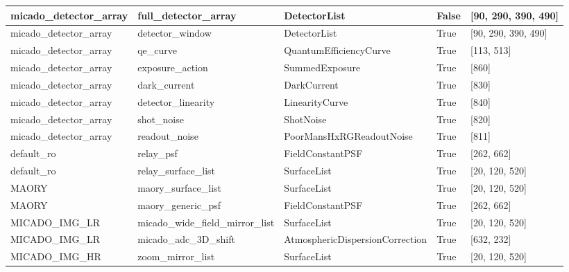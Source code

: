 \begin{longtable*}[c]{|p{0.181\DUtablewidth}|p{0.270\DUtablewidth}|p{0.262\DUtablewidth}|p{0.077\DUtablewidth}|p{0.165\DUtablewidth}|}
micado\_detector\_array
 & 
full\_detector\_array
 & 
DetectorList
 & 
False
 & 
{[}90, 290, 390, 490{]}
 \\
\hline

micado\_detector\_array
 & 
detector\_window
 & 
DetectorList
 & 
True
 & 
{[}90, 290, 390, 490{]}
 \\
\hline

micado\_detector\_array
 & 
qe\_curve
 & 
QuantumEfficiencyCurve
 & 
True
 & 
{[}113, 513{]}
 \\
\hline

micado\_detector\_array
 & 
exposure\_action
 & 
SummedExposure
 & 
True
 & 
{[}860{]}
 \\
\hline

micado\_detector\_array
 & 
dark\_current
 & 
DarkCurrent
 & 
True
 & 
{[}830{]}
 \\
\hline

micado\_detector\_array
 & 
detector\_linearity
 & 
LinearityCurve
 & 
True
 & 
{[}840{]}
 \\
\hline

micado\_detector\_array
 & 
shot\_noise
 & 
ShotNoise
 & 
True
 & 
{[}820{]}
 \\
\hline

micado\_detector\_array
 & 
readout\_noise
 & 
PoorMansHxRGReadoutNoise
 & 
True
 & 
{[}811{]}
 \\
\hline

default\_ro
 & 
relay\_psf
 & 
FieldConstantPSF
 & 
True
 & 
{[}262, 662{]}
 \\
\hline

default\_ro
 & 
relay\_surface\_list
 & 
SurfaceList
 & 
True
 & 
{[}20, 120, 520{]}
 \\
\hline

MAORY
 & 
maory\_surface\_list
 & 
SurfaceList
 & 
True
 & 
{[}20, 120, 520{]}
 \\
\hline

MAORY
 & 
maory\_generic\_psf
 & 
FieldConstantPSF
 & 
True
 & 
{[}262, 662{]}
 \\
\hline

MICADO\_IMG\_LR
 & 
micado\_wide\_field\_mirror\_list
 & 
SurfaceList
 & 
True
 & 
{[}20, 120, 520{]}
 \\
\hline

MICADO\_IMG\_LR
 & 
micado\_adc\_3D\_shift
 & 
AtmosphericDispersionCorrection
 & 
True
 & 
{[}632, 232{]}
 \\
\hline

MICADO\_IMG\_HR
 & 
zoom\_mirror\_list
 & 
SurfaceList
 & 
True
 & 
{[}20, 120, 520{]}
 \\
\hline


\end{longtable*}
